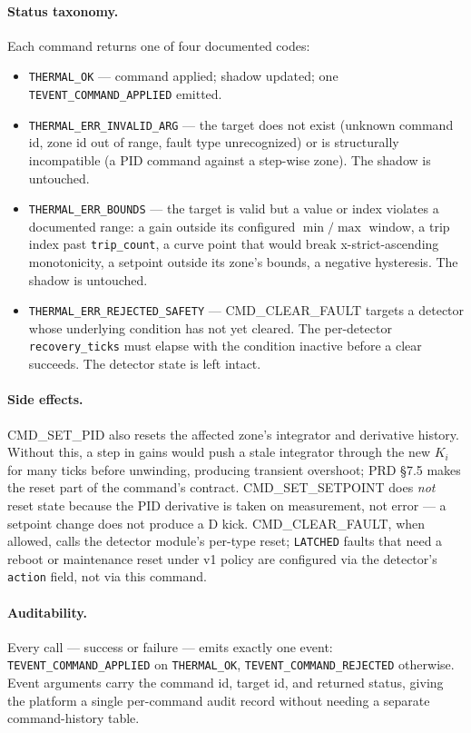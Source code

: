 \paragraph{Status taxonomy.} Each command returns one of four documented codes:

\begin{itemize}[leftmargin=*]
    \item \texttt{THERMAL\_OK} --- command applied; shadow updated; one \texttt{TEVENT\_COMMAND\_APPLIED} emitted.
    \item \texttt{THERMAL\_ERR\_INVALID\_ARG} --- the target does not exist (unknown command id, zone id out of range, fault type unrecognized) or is structurally incompatible (a PID command against a step-wise zone). The shadow is untouched.
    \item \texttt{THERMAL\_ERR\_BOUNDS} --- the target is valid but a value or index violates a documented range: a gain outside its configured \(\min/\max\) window, a trip index past \texttt{trip\_count}, a curve point that would break x-strict-ascending monotonicity, a setpoint outside its zone's bounds, a negative hysteresis. The shadow is untouched.
    \item \texttt{THERMAL\_ERR\_REJECTED\_SAFETY} --- CMD\_CLEAR\_FAULT targets a detector whose underlying condition has not yet cleared. The per-detector \texttt{recovery\_ticks} must elapse with the condition inactive before a clear succeeds. The detector state is left intact.
\end{itemize}

\paragraph{Side effects.} CMD\_SET\_PID also resets the affected zone's integrator and derivative history. Without this, a step in gains would push a stale integrator through the new $K_i$ for many ticks before unwinding, producing transient overshoot; PRD §7.5 makes the reset part of the command's contract. CMD\_SET\_SETPOINT does \emph{not} reset state because the PID derivative is taken on measurement, not error --- a setpoint change does not produce a D kick. CMD\_CLEAR\_FAULT, when allowed, calls the detector module's per-type reset; \texttt{LATCHED} faults that need a reboot or maintenance reset under v1 policy are configured via the detector's \texttt{action} field, not via this command.

\paragraph{Auditability.} Every call --- success or failure --- emits exactly one event: \texttt{TEVENT\_COMMAND\_APPLIED} on \texttt{THERMAL\_OK}, \texttt{TEVENT\_COMMAND\_REJECTED} otherwise. Event arguments carry the command id, target id, and returned status, giving the platform a single per-command audit record without needing a separate command-history table.


